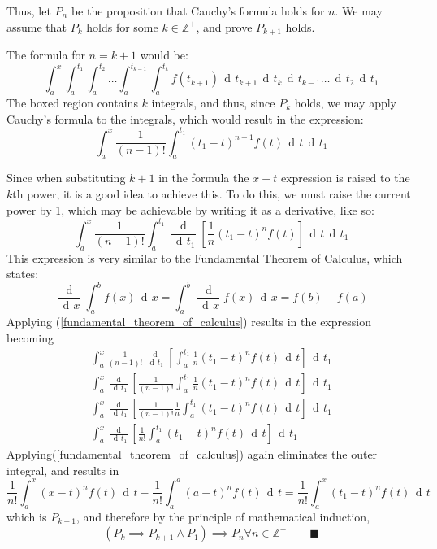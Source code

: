 \documentclass{article}
\DeclareMathOperator{\di}{\,d\!}
\begin{document}
Thus, let $P_n$ be the proposition that Cauchy's formula holds for $n$. We may
assume that $P_k$ holds for some $k \in \mathbb{Z}^+$, and prove $P_{k+1}$
holds.

The formula for $n = k + 1$ would be:
$$
\int_a^x
\boxed{
\int_a^{t_1}
\int_a^{t_2}
\ldots
\int_a^{t_{k-1}}
\int_a^{t_k}f\left(t_{k+1}\right) \di t_{k+1}\di t_k\di t_{k-1} \ldots \di t_2}\di t_1
$$
The boxed region contains $k$ integrals, and thus, since $P_k$ holds, we may apply
Cauchy's formula to the integrals, which would result in the expression:
$$
\int_a^x
\frac{1}{(n-1)!}\int_a^{t_1}\left(t_1-t\right)^{n-1}f\left(t\right)\di t\di t_1
$$

Since when substituting $k+1$ in the formula the $x-t$ expression is raised to
the $k$th power, it is a good idea to achieve this. To do this, we must raise
the current power by 1, which may be achievable by writing it as a derivative,
like so:
$$
\int_a^x
\frac{1}{(n-1)!}\int_a^{t_1}\frac{\di}{\di t_1}\left[\frac{1}{n}\left(t_1-t\right)^nf\left(t\right)\right]\di t\di t_1
$$
This expression is very similar to the Fundamental Theorem of Calculus, which states:
\begin{equation}
	\label{fundamental_theorem_of_calculus}
\frac{\di}{\di x}\int_a^bf(x)\di x = \int_a^b\frac{\di}{\di x}f(x) \di x = f(b)- f(a)
\end{equation}
Applying (\ref{fundamental_theorem_of_calculus}) results in the expression becoming
\begin{gather*}
\int_a^x
\frac{1}{(n-1)!}\frac{\di}{\di t_1}\left[\int_a^{t_1}\frac{1}{n}\left(t_1-t\right)^nf(t)\di t\right]\di t_1 \\
\int_a^x
\frac{\di}{\di t_1}\left[\frac{1}{(n-1)!}\int_a^{t_1}\frac{1}{n}\left(t_1-t\right)^nf(t)\di t\right]\di t_1 \\
\int_a^x
\frac{\di}{\di t_1}\left[\frac{1}{(n-1)!}\frac{1}{n}\int_a^{t_1}\left(t_1-t\right)^nf(t)\di t\right]\di t_1 \\
\int_a^x
\frac{\di}{\di t_1}\left[\frac{1}{n!}\int_a^{t_1}\left(t_1-t\right)^nf(t)\di t\right]\di t_1
\end{gather*}
Applying(\ref{fundamental_theorem_of_calculus}) again eliminates the outer integral,
and results in
$$
\frac{1}{n!}\int_a^x\left(x-t\right)^nf(t)\di t -
\frac{1}{n!}\int_a^a\left(a-t\right)^nf(t)\di t =
\frac{1}{n!}\int_a^x\left(t_1-t\right)^nf(t)\di t
$$
which is $P_{k+1}$, and therefore by the principle of mathematical induction,
$$
\left(P_k \implies P_{k+1} \land P_1\right)
\implies P_n \forall n \in \mathbb{Z}^+
\qquad \blacksquare
$$
\end{document}
